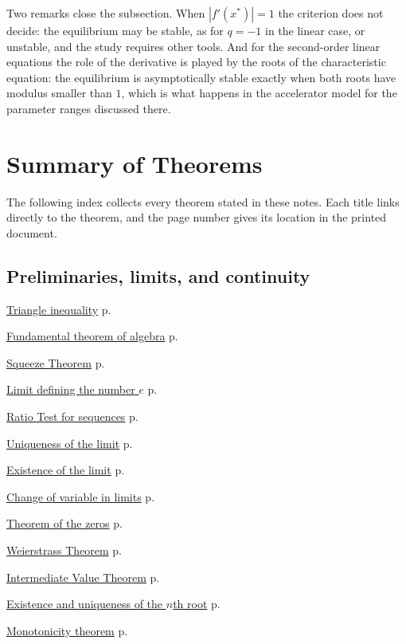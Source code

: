 \documentclass[11pt,a4paper]{article}
\theoremstyle{definition} \newtheorem{definition}{Definition} \theoremstyle{plain} \newtheorem{theorem}{Theorem}
\begin{document}
Two remarks close the subsection. When $|f'(x^*)|=1$ the criterion does
not decide: the equilibrium may be stable, as for $q=-1$ in the linear
case, or unstable, and the study requires other tools. And for the
second-order linear equations the role of the derivative is played by
the roots of the characteristic equation: the equilibrium is
asymptotically stable exactly when both roots have modulus smaller than
$1$, which is what happens in the accelerator model for the parameter
ranges discussed there.

\clearpage
{}
\section*{Summary of Theorems}
The following index collects every theorem stated in these notes. Each title
links directly to the theorem, and the page number gives its location in the
printed document.

\subsection*{Preliminaries, limits, and continuity}
\begin{description}
\item \hyperref[thm:triangle-inequality]{Triangle inequality} \dotfill p.~\pageref{thm:triangle-inequality}
\item \hyperref[thm:fundamental-algebra]{Fundamental theorem of algebra} \dotfill p.~\pageref{thm:fundamental-algebra}
\item \hyperref[thm:squeeze]{Squeeze Theorem} \dotfill p.~\pageref{thm:squeeze}
\item \hyperref[thm:limit-e]{Limit defining the number $e$} \dotfill p.~\pageref{thm:limit-e}
\item \hyperref[thm:ratio-test-limits]{Ratio Test for sequences} \dotfill p.~\pageref{thm:ratio-test-limits}
\item \hyperref[thm:uniqueness-limit]{Uniqueness of the limit} \dotfill p.~\pageref{thm:uniqueness-limit}
\item \hyperref[thm:existence-limit]{Existence of the limit} \dotfill p.~\pageref{thm:existence-limit}
\item \hyperref[thm:change-variable-limits]{Change of variable in limits} \dotfill p.~\pageref{thm:change-variable-limits}
\item \hyperref[thm:zeros]{Theorem of the zeros} \dotfill p.~\pageref{thm:zeros}
\item \hyperref[thm:weierstrass]{Weierstrass Theorem} \dotfill p.~\pageref{thm:weierstrass}
\item \hyperref[thm:intermediate-value]{Intermediate Value Theorem} \dotfill p.~\pageref{thm:intermediate-value}
\item \hyperref[thm:nth-root]{Existence and uniqueness of the $n$th root} \dotfill p.~\pageref{thm:nth-root}
\item \hyperref[thm:monotonicity]{Monotonicity theorem} \dotfill p.~\pageref{thm:monotonicity}
\end{description}
\end{document}
